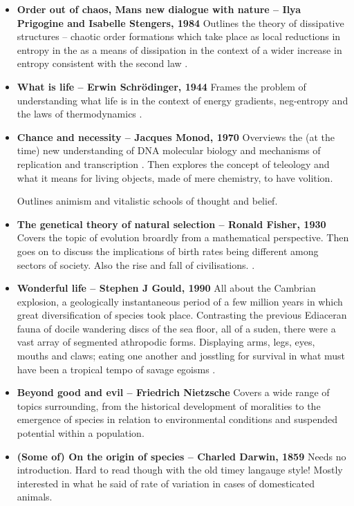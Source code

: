 \begin{itemize}
\item \textbf{Order out of chaos,  Mans new dialogue with nature --  Ilya Prigogine and Isabelle Stengers,  1984}
Outlines the theory of dissipative structures -- chaotic order formations which take place as local reductions in entropy in the as a means of dissipation in the context of a wider increase in entropy consistent with the second law \cite{prigogine2018order}.

\item \textbf{What is life -- Erwin Schrödinger, 1944}
Frames the problem of understanding what life is in the context of energy gradients,  neg-entropy and the laws of thermodynamics \cite{schrodinger1946life}.   

\item \textbf{Chance and necessity -- Jacques Monod, 1970}
Overviews the (at the time) new understanding of DNA molecular biology and mechanisms of replication and transcription \cite{monod1974chance}.  Then explores the concept of teleology and what it means for living objects, made of mere chemistry, to have volition. \par 
Outlines animism and vitalistic schools of thought and belief.

\item \textbf{The genetical theory of natural selection -- Ronald Fisher, 1930}
Covers the topic of evolution broardly from a mathematical perspective. Then goes on to discuss the implications of birth rates being different among sectors of society.  Also the rise and fall of civilisations. \cite{fisher1929genetical}. 

\item \textbf{Wonderful life -- Stephen J Gould, 1990}
All about the Cambrian explosion,  a geologically instantaneous period of a few million years in which great diversification of species took place.  Contrasting the previous Ediaceran fauna of docile wandering discs of the sea floor, all of a suden, there were a vast array of segmented athropodic forms.  Displaying arms, legs, eyes, mouths and claws;  eating one another and josstling for survival in what must have been a tropical tempo of savage egoisms \cite{gould1989wonderful}. 

\item \textbf{Beyond good and evil -- Friedrich Nietzsche}
Covers a wide range of topics surrounding, from the historical development of moralities to the emergence of species in relation to environmental conditions and suspended potential within a population.  \cite{nietzsche2013beyond}

\item \textbf{(Some of) On the origin of species -- Charled Darwin, 1859}
Needs no introduction.  Hard to read though with the old timey langauge style! Mostly interested in what he said of rate of variation in cases of domesticated animals.  \cite{darwin1859origin} 
\end{itemize}


